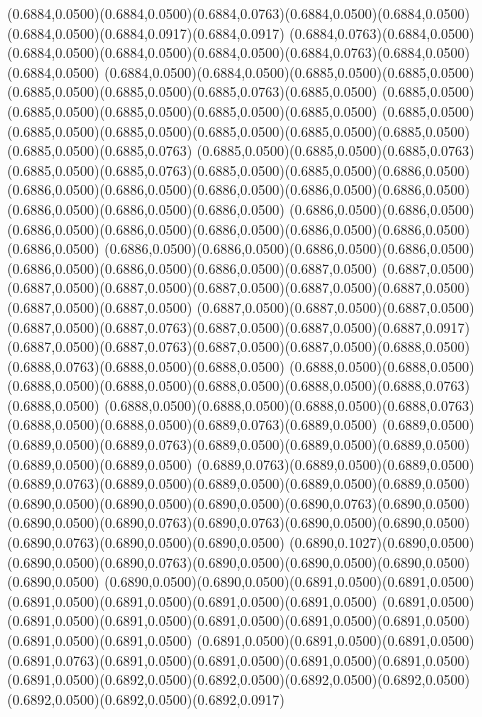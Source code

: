 (0.6884,0.0500)(0.6884,0.0500)(0.6884,0.0763)(0.6884,0.0500)(0.6884,0.0500)(0.6884,0.0500)(0.6884,0.0917)(0.6884,0.0917)
(0.6884,0.0763)(0.6884,0.0500)(0.6884,0.0500)(0.6884,0.0500)(0.6884,0.0500)(0.6884,0.0763)(0.6884,0.0500)(0.6884,0.0500)
(0.6884,0.0500)(0.6884,0.0500)(0.6885,0.0500)(0.6885,0.0500)(0.6885,0.0500)(0.6885,0.0500)(0.6885,0.0763)(0.6885,0.0500)
(0.6885,0.0500)(0.6885,0.0500)(0.6885,0.0500)(0.6885,0.0500)(0.6885,0.0500)
\PST@Solid(0.6885,0.0500)(0.6885,0.0500)(0.6885,0.0500)(0.6885,0.0500)(0.6885,0.0500)(0.6885,0.0500)(0.6885,0.0500)(0.6885,0.0763)
(0.6885,0.0500)(0.6885,0.0500)(0.6885,0.0763)(0.6885,0.0500)(0.6885,0.0763)(0.6885,0.0500)(0.6885,0.0500)(0.6886,0.0500)
(0.6886,0.0500)(0.6886,0.0500)(0.6886,0.0500)(0.6886,0.0500)(0.6886,0.0500)(0.6886,0.0500)(0.6886,0.0500)(0.6886,0.0500)
(0.6886,0.0500)(0.6886,0.0500)(0.6886,0.0500)(0.6886,0.0500)(0.6886,0.0500)(0.6886,0.0500)(0.6886,0.0500)(0.6886,0.0500)
(0.6886,0.0500)(0.6886,0.0500)(0.6886,0.0500)(0.6886,0.0500)(0.6886,0.0500)(0.6886,0.0500)(0.6886,0.0500)(0.6887,0.0500)
(0.6887,0.0500)(0.6887,0.0500)(0.6887,0.0500)(0.6887,0.0500)(0.6887,0.0500)(0.6887,0.0500)(0.6887,0.0500)(0.6887,0.0500)
(0.6887,0.0500)(0.6887,0.0500)(0.6887,0.0500)(0.6887,0.0500)(0.6887,0.0763)(0.6887,0.0500)(0.6887,0.0500)(0.6887,0.0917)
(0.6887,0.0500)(0.6887,0.0763)(0.6887,0.0500)(0.6887,0.0500)(0.6888,0.0500)(0.6888,0.0763)(0.6888,0.0500)(0.6888,0.0500)
(0.6888,0.0500)(0.6888,0.0500)(0.6888,0.0500)(0.6888,0.0500)(0.6888,0.0500)(0.6888,0.0500)(0.6888,0.0763)(0.6888,0.0500)
(0.6888,0.0500)(0.6888,0.0500)(0.6888,0.0500)(0.6888,0.0763)(0.6888,0.0500)(0.6888,0.0500)(0.6889,0.0763)(0.6889,0.0500)
(0.6889,0.0500)(0.6889,0.0500)(0.6889,0.0763)(0.6889,0.0500)(0.6889,0.0500)(0.6889,0.0500)(0.6889,0.0500)(0.6889,0.0500)
(0.6889,0.0763)(0.6889,0.0500)(0.6889,0.0500)(0.6889,0.0763)(0.6889,0.0500)(0.6889,0.0500)(0.6889,0.0500)(0.6889,0.0500)
(0.6890,0.0500)(0.6890,0.0500)(0.6890,0.0500)(0.6890,0.0763)(0.6890,0.0500)
\PST@Solid(0.6890,0.0500)(0.6890,0.0763)(0.6890,0.0763)(0.6890,0.0500)(0.6890,0.0500)(0.6890,0.0763)(0.6890,0.0500)(0.6890,0.0500)
(0.6890,0.1027)(0.6890,0.0500)(0.6890,0.0500)(0.6890,0.0763)(0.6890,0.0500)(0.6890,0.0500)(0.6890,0.0500)(0.6890,0.0500)
(0.6890,0.0500)(0.6890,0.0500)(0.6891,0.0500)(0.6891,0.0500)(0.6891,0.0500)(0.6891,0.0500)(0.6891,0.0500)(0.6891,0.0500)
(0.6891,0.0500)(0.6891,0.0500)(0.6891,0.0500)(0.6891,0.0500)(0.6891,0.0500)(0.6891,0.0500)(0.6891,0.0500)(0.6891,0.0500)
(0.6891,0.0500)(0.6891,0.0500)(0.6891,0.0500)(0.6891,0.0763)(0.6891,0.0500)(0.6891,0.0500)(0.6891,0.0500)(0.6891,0.0500)
(0.6891,0.0500)(0.6892,0.0500)(0.6892,0.0500)(0.6892,0.0500)(0.6892,0.0500)(0.6892,0.0500)(0.6892,0.0500)(0.6892,0.0917)
